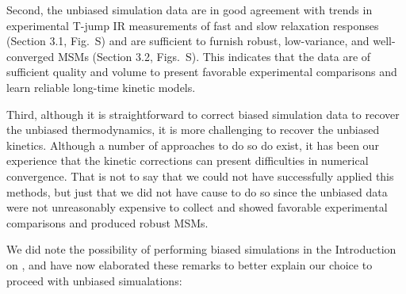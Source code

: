 \documentclass[11pt,a4paper]{letter} %
\newcommand*{\rood}[1]{{\color{red}{#1}}}
\begin{document}
Second, the unbiased simulation data are in good agreement with trends in experimental T-jump IR measurements of fast and slow relaxation responses (Section 3.1, Fig.~S\rood{4}) and are sufficient to furnish robust, low-variance, and well-converged MSMs (Section 3.2, Figs.~S\rood{1-3}). This indicates that the data are of sufficient quality and volume to present favorable experimental comparisons and learn reliable long-time kinetic models.

Third, although it is straightforward to correct biased simulation data to recover the unbiased thermodynamics, it is more challenging to recover the unbiased kinetics. Although a number of approaches to do so do exist, it has been our experience that the kinetic corrections can present difficulties in numerical convergence. That is not to say that we could not have successfully applied this methods, but just that we did not have cause to do so since the unbiased data were not unreasonably expensive to collect and showed favorable experimental comparisons and produced robust MSMs.

We did note the possibility of performing biased simulations in the Introduction on \rood{p.~4}, and have now elaborated these remarks to better explain our choice to proceed with unbiased simualations:
\end{document}
